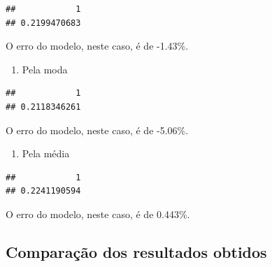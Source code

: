 \documentclass[a4paper]{article}
\newenvironment{Shaded}{\begin{snugshade}}{\end{snugshade}}
\newcommand{\KeywordTok}[1]{\textcolor[rgb]{0.13,0.29,0.53}{\textbf{#1}}}
\newcommand{\DecValTok}[1]{\textcolor[rgb]{0.00,0.00,0.81}{#1}}
\newcommand{\StringTok}[1]{\textcolor[rgb]{0.31,0.60,0.02}{#1}}
\newcommand{\OperatorTok}[1]{\textcolor[rgb]{0.81,0.36,0.00}{\textbf{#1}}}
\newcommand{\NormalTok}[1]{#1}
\providecommand{\tightlist}{%
  \setlength{\itemsep}{0pt}\setlength{\parskip}{0pt}}
\begin{document}
\begin{verbatim}
##            1 
## 0.2199470683
\end{verbatim}

O erro do modelo, neste caso, é de -1.43\%.

\begin{enumerate}
\def\labelenumi{\alph{enumi}.}
\setcounter{enumi}{1}
\tightlist
\item
  Pela moda
\end{enumerate}

\begin{Shaded}
\end{Shaded}

\begin{verbatim}
##            1 
## 0.2118346261
\end{verbatim}

O erro do modelo, neste caso, é de -5.06\%.

\begin{enumerate}
\def\labelenumi{\alph{enumi}.}
\setcounter{enumi}{2}
\tightlist
\item
  Pela média
\end{enumerate}

\begin{Shaded}
\end{Shaded}

\begin{verbatim}
##            1 
## 0.2241190594
\end{verbatim}

O erro do modelo, neste caso, é de 0.443\%.

\subsection{Comparação dos resultados
obtidos}\label{comparacao-dos-resultados-obtidos}
\end{document}
